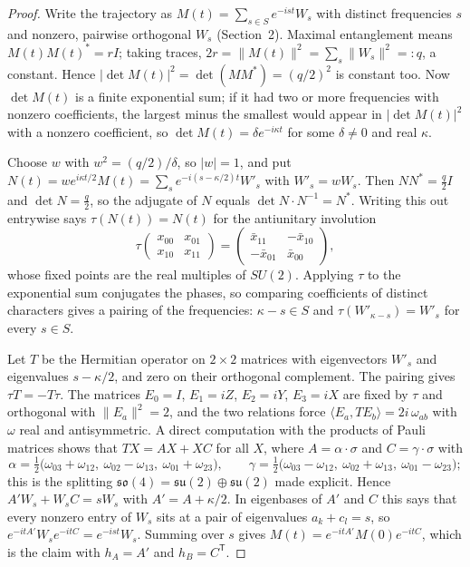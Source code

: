 \documentclass[11pt]{article}
\theoremstyle{remark}
\newcommand{\ip}[2]{\langle #1,#2\rangle}
\begin{document}
\begin{proof}
Write the trajectory as $M(t)=\sum_{s\in S}e^{-ist}W_s$ with distinct frequencies $s$ and
nonzero, pairwise orthogonal $W_s$ (Section~2). Maximal entanglement means $M(t)M(t)^*=rI$;
taking traces, $2r=\lVert M(t)\rVert^2=\sum_s\lVert W_s\rVert^2=:q$, a constant. Hence
$\lvert\det M(t)\rvert^2=\det(MM^*)=(q/2)^2$ is constant too. Now $\det M(t)$ is a finite
exponential sum; if it had two or more frequencies with nonzero coefficients, the largest minus
the smallest would appear in $\lvert\det M(t)\rvert^2$ with a nonzero coefficient, so $\det
M(t)=\delta e^{-i\kappa t}$ for some $\delta\ne0$ and real $\kappa$.

Choose $w$ with $w^2=(q/2)/\delta$, so $\lvert w\rvert=1$, and put $N(t)=we^{i\kappa t/2}M(t)=
\sum_se^{-i(s-\kappa/2)t}W'_s$ with $W'_s=wW_s$. Then $NN^*=\tfrac q2I$ and $\det N=\tfrac q2$,
so the adjugate of $N$ equals $\det N\cdot N^{-1}=N^*$. Writing this out entrywise says
$\tau(N(t))=N(t)$ for the antiunitary involution
\[
\tau\begin{pmatrix}x_{00}&x_{01}\\ x_{10}&x_{11}\end{pmatrix}=
\begin{pmatrix}\bar x_{11}&-\bar x_{10}\\ -\bar x_{01}&\bar x_{00}\end{pmatrix},
\]
whose fixed points are the real multiples of $SU(2)$. Applying $\tau$ to the exponential sum
conjugates the phases, so comparing coefficients of distinct characters gives a pairing of the
frequencies: $\kappa-s\in S$ and $\tau(W'_{\kappa-s})=W'_s$ for every $s\in S$.

Let $T$ be the Hermitian operator on $2\times2$ matrices with eigenvectors $W'_s$ and
eigenvalues $s-\kappa/2$, and zero on their orthogonal complement. The pairing gives
$\tau T=-T\tau$. The matrices $E_0=I$, $E_1=iZ$, $E_2=iY$, $E_3=iX$ are fixed by $\tau$ and
orthogonal with $\lVert E_a\rVert^2=2$, and the two relations force
$\ip{E_a}{TE_b}=2i\,\omega_{ab}$ with $\omega$ real and antisymmetric. A direct computation
with the products of Pauli matrices shows that $TX=AX+XC$ for all $X$, where $A=\alpha\cdot
\sigma$ and $C=\gamma\cdot\sigma$ with
\[
\alpha=\tfrac12\bigl(\omega_{03}+\omega_{12},\ \omega_{02}-\omega_{13},\ \omega_{01}+\omega_{23}\bigr),
\qquad
\gamma=\tfrac12\bigl(\omega_{03}-\omega_{12},\ \omega_{02}+\omega_{13},\ \omega_{01}-\omega_{23}\bigr);
\]
this is the splitting $\mathfrak{so}(4)=\mathfrak{su}(2)\oplus\mathfrak{su}(2)$ made explicit.
Hence $A'W_s+W_sC=sW_s$ with $A'=A+\kappa/2$. In eigenbases of $A'$ and $C$ this says that
every nonzero entry of $W_s$ sits at a pair of eigenvalues $a_k+c_l=s$, so $e^{-itA'}W_s
e^{-itC}=e^{-ist}W_s$. Summing over $s$ gives $M(t)=e^{-itA'}M(0)e^{-itC}$, which is the claim
with $h_A=A'$ and $h_B=C^{\mathsf T}$.
\end{proof}
\end{document}
